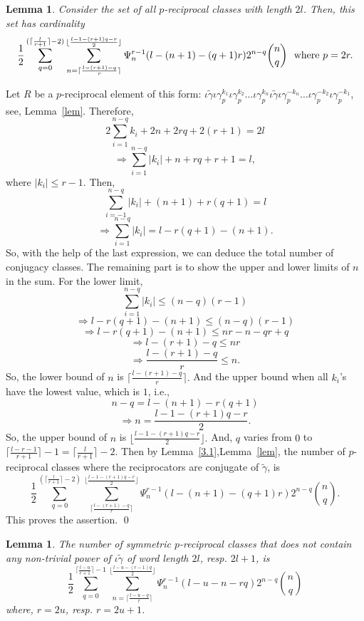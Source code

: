 \documentclass[11pt]{amsart}
\renewenvironment{proof}{{\bfseries Proof.}}{\qed}
\numberwithin{equation}{section}
\newtheorem{lemma}[theorem]{Lemma}
\theoremstyle{definition}
\newcommand{\gt}{\tilde{\gamma}}
\newcommand{\imp}{\Rightarrow}
\newcommand{\g}{\gamma_{p}}
\newcommand{\io}{\iota }
\newcommand{\lemref}[1]{Lemma~\ref{#1}}
\numberwithin{equation}{section}
\begin{document}
		\medskip 
		\begin{lemma}
			Consider the set of all  $p$-reciprocal classes with length $2l$. Then, this set has cardinality
			$$  \frac{1}{2}\sum_{q=0}^{(\lceil\frac{l}{r+1}\rceil-2)} \sum_{n=\lceil \frac{l-(r+1)-q}{r}\rceil}^{\lfloor\frac{l-1-(r+1)q-r}{2}\rfloor} \Psi_{n}^{r-1}(l-(n+1)-(q+1)r)2^{n-q} {n\choose q} ~ \hbox{ where }p=2r.$$
			
		\end{lemma}
		\begin{proof}
			Let $R$ be a $p$-reciprocal element of this form: $ \io \gt\io \g^{k_{1}}\io \g^{k_{2}}\dots \io \g^{k_{n}}\io \gt\io \g^{-k_{n}}\dots\io \g^{-k_{2}}\io \g^{-k_{1}}$, see, \lemref{lem}.
			Therefore,
			\[2\sum^{n-q}_{i=1}k_i+2n+2rq+2(r+1)=2l\]
			\begin{equation}
				\imp	\sum_{i=1}^{n-q} |k_{i}|+n+rq+ r+1=l, 
			\end{equation} where $ {|k_i|}\leq r-1$. Then, 
			\[ \sum_{i=-1}^{n-q}{|k_{i}|}+(n+1)+r(q+1)=l\]
			\[\imp \sum_{i=1}^{n-q} |k_{i}|=l-r(q+1)-(n+1).\]
			So, with the help of the last expression, we can deduce the total number of conjugacy classes. The remaining part is to show the upper and lower limits of $ n $ in the sum. 
			For the lower limit, 
			\[\sum_{i=1}^{n-q}|k_{i}|\leq (n-q)(r-1)\]
			\[\imp l-r(q+1)-(n+1) \leq (n-q)(r-1)\]
			\[\imp  l-r(q+1)-(n+1) \leq nr-n-qr+q \]
			\[\imp l-(r+1)-q\leq nr\]
			\[\imp \frac{l-(r+1)-q}{r}\leq n.\]
			So, the lower bound of $ n $ is $ \lceil \frac{l-(r+1)-q}{r}\rceil .$
			And the upper bound when all $ k_{i} $'s have the lowest value, which is $ 1 $, i.e.,
			\[n-q=l-(n+1)-r(q+1)\]
			\[\imp n=\frac{l-1-(r+1)q-r}{2}.\]
			So, the upper bound of $n$ is $ \lfloor\frac{l-1-(r+1)q-r}{2}\rfloor. $ And, $q$ varies from $0$ to $\lceil\frac{l-r-1}{r+1}\rceil-1=\lceil\frac{l}{r+1}\rceil-2$.  Then by \lemref{3.1},\lemref{lem}, the number of $ p $-reciprocal classes where the reciprocators are conjugate of $\gt$, is 
			$$  \frac{1}{2}\sum_{q=0}^{(\lceil\frac{l}{r+1}\rceil-2)} \sum_{\lceil \frac{l-(r+1)-q}{r}\rceil}^{\lfloor\frac{l-1-(r+1)q-r}{2}\rfloor} \Psi_{n}^{r-1}(l-(n+1)-(q+1)r)2^{n-q} {n\choose q}.$$
			This proves the assertion. 
		\end{proof}
		\begin{lemma}\label{lem1}
			The number of symmetric $p$-reciprocal classes that does not contain any non-trivial power of $ \io\gt $ of word length $ 2l $, resp.  $2l+1$,  is $$\frac{1}{2}\sum_{q=0}^{\lceil\frac{l-u}{r+1}\rceil-1} \sum_{n= \lceil\frac{l-u-q}{r}\rceil }^{\lfloor \frac{l-u-(r-1)q}{2}\rfloor}\Psi_{n}^{r-1}(l-u-n-rq)2^{n-q} {n \choose q} $$ where, $r=2u $, resp. $r=2u+1$.
		\end{lemma}
\end{document}
